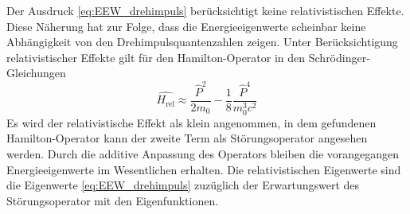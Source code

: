 
Der Ausdruck \eqref{eq:EEW_drehimpuls} berücksichtigt keine relativistischen Effekte.
Diese Näherung hat zur Folge, dass die Energieeigenwerte scheinbar keine Abhängigkeit von den Drehimpulsquantenzahlen zeigen.
Unter Berücksichtigung relativistischer Effekte gilt für den Hamilton-Operator in den Schrödinger-Gleichungen
\begin{equation}
	\hat{H_\text{rel}}\approx\frac{\hat{P}^2}{2m_0}-\frac{1}{8}\frac{\hat{P}^4}{m_0^3 c^2}
	\label{eq:relativerhamilton}
\end{equation}
Es wird der relativistische Effekt als klein angenommen, in dem gefundenen Hamilton-Operator kann der zweite Term als Störungsoperator angesehen werden.
Durch die additive Anpassung des Operators bleiben die vorangegangen Energieeigenwerte im Wesentlichen erhalten.
Die relativistischen Eigenwerte sind die Eigenwerte \eqref{eq:EEW_drehimpuls} zuzüglich der Erwartungswert des Störungsoperator mit den Eigenfunktionen.


